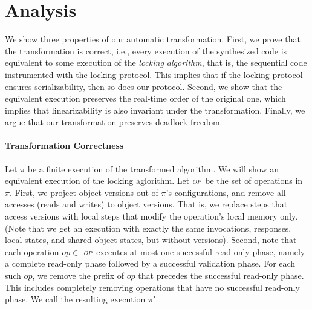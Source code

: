 \newcommand{\op}{\emph{\textsc{op}}}
\newcommand{\opt}{\textsc{opt}}

\section{Analysis}
\label{sec:proof}

We show  three properties of our automatic transformation. First, we prove that the  transformation is correct, i.e., 
every execution of the  synthesized code is equivalent to some execution of the \emph{locking algorithm}, that is, the
sequential code instrumented with the locking protocol.
This implies that if the locking protocol ensures serializability, then so does our protocol.
Second, we show that the equivalent execution preserves the real-time order of the original one, 
which implies that linearizability is also invariant under the transformation.
Finally, we argue that our transformation preserves deadlock-freedom.

\paragraph{Transformation Correctness}

Let $\pi$ be a finite execution of the transformed algorithm. We will show an equivalent execution of the locking aglorithm.
Let \op\ be the set of operations in $\pi$.
First, we project object versions out of $\pi$'s configurations, and remove all accesses (reads and writes) to object versions.
That is, we replace steps that access versions with local steps that modify the operation's local memory only.
(Note that we get an execution with exactly the same invocations, responses, local states, and shared object states, but without 
versions). 
Second, note that each operation $op \in$ \op\ executes at most one successful read-only
phase, namely a complete read-only phase followed by a successful validation phase.
For each such $op$, we remove the prefix of $op$ that precedes the successful read-only phase.
This includes completely removing operations that have no successful read-only phase.
We call the resulting execution $\pi'$.

